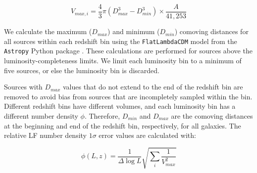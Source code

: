 \begin{equation}
    \label{EQ: Vmax}
    V_{max,i} = \frac{4}{3} \pi \left(D_{max}^3 - D_{min}^3\right) \times \frac{A}{41,253}
\end{equation}

We calculate the maximum ($D_{max}$) and minimum ($D_{min}$) comoving distances for all sources within each redshift bin using the \texttt{FlatLambdaCDM} model from the \texttt{Astropy} Python package \citep{astropy_collaboration_astropy_2022}. These calculations are performed for sources above the luminosity-completeness limits. We limit each luminosity bin to a minimum of five sources, or else the luminosity bin is discarded. 

Sources with $D_{max}$ values that do not extend to the end of the redshift bin are removed to avoid bias from sources that are incompletely sampled within the bin. Different redshift bins have different volumes, and each luminosity bin has a different number density $\phi$. Therefore, $D_{min}$ and $D_{max}$ are the comoving distances at the beginning and end of the redshift bin, respectively, for all galaxies. The relative LF number density $1\sigma$ error values are calculated with:

\begin{equation} \label{EQ: Vmax Error}
    \phi(L,z) = \frac{1}{\Delta \log L}\sqrt{\sum_i \frac{1}{V_{max}^2}}
\end{equation}

